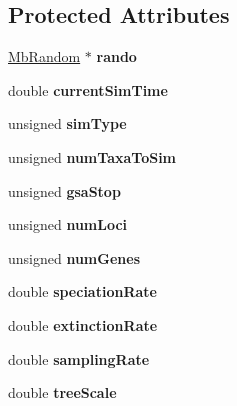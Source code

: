 \subsection*{Protected Attributes}
\begin{DoxyCompactItemize}
\item 
\mbox{\label{class_simulator_a3eb24e849f10dbd8bef87da970511c7b}} 
\mbox{\hyperlink{class_mb_random}{Mb\+Random}} $\ast$ {\bfseries rando}
\item 
\mbox{\label{class_simulator_adf98331a1a0ebb7a1069b61a8976f4a1}} 
double {\bfseries current\+Sim\+Time}
\item 
\mbox{\label{class_simulator_a0e84e88de706df317cd1063e541f8ac1}} 
unsigned {\bfseries sim\+Type}
\item 
\mbox{\label{class_simulator_a115e62bbda9ef2e5752e2f81715ecf2f}} 
unsigned {\bfseries num\+Taxa\+To\+Sim}
\item 
\mbox{\label{class_simulator_acd694573dc9c43fcdcb6b66dd9154922}} 
unsigned {\bfseries gsa\+Stop}
\item 
\mbox{\label{class_simulator_a44e52c29507eb9f839a9639549edb090}} 
unsigned {\bfseries num\+Loci}
\item 
\mbox{\label{class_simulator_a0fccba7c833003a8fa9f2bfb1932d722}} 
unsigned {\bfseries num\+Genes}
\item 
\mbox{\label{class_simulator_abf61f355da53b56851551e2bae7515d9}} 
double {\bfseries speciation\+Rate}
\item 
\mbox{\label{class_simulator_ac302a3cf8940ffcca2f573b53c66470c}} 
double {\bfseries extinction\+Rate}
\item 
\mbox{\label{class_simulator_a30d21940bc8123bfbe314b04610b7734}} 
double {\bfseries sampling\+Rate}
\item 
\mbox{\label{class_simulator_ad75c237a9f496ed7352ec729e22f8b49}} 
double {\bfseries tree\+Scale}

\end{DoxyCompactItemize}
